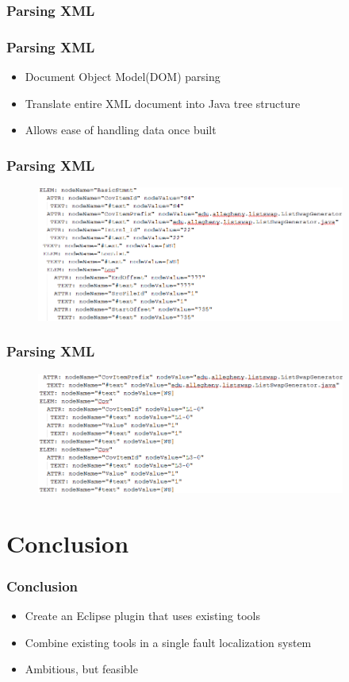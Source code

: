 \documentclass{beamer}
\begin{document}
	\subsubsection{Parsing XML}
	\begin{frame}
		\frametitle{Parsing XML}
		\begin{itemize}
	    	\item Document Object Model(DOM) parsing
	    	\pause
	    	\item Translate entire XML document into Java tree structure
	    	\pause
	    	\item Allows ease of handling data once built
		\end{itemize}
	\end{frame}
	\begin{frame}
	\frametitle{Parsing XML}
	  	\begin{figure}
	  		\label{parsedxmlstmt}
	  		\includegraphics[width=4in]{img/parsedxmlstmt}
	  	\end{figure}
	\end{frame}
	\begin{frame}
	\frametitle{Parsing XML}
	  	\begin{figure}
	  		\label{parsedxmlcover}
	  		\includegraphics[width=4in]{img/parsedxmlcover}
	  	\end{figure}
	\end{frame}
	\section{Conclusion}
	\begin{frame}
		\frametitle{Conclusion}
		\begin{itemize}
	    	\item Create an Eclipse plugin that uses existing tools
	    	\pause
	    	\item Combine existing tools in a single fault localization system
	    	\pause
	    	\item Ambitious, but feasible
		\end{itemize}
	\end{frame}
\end{document}
